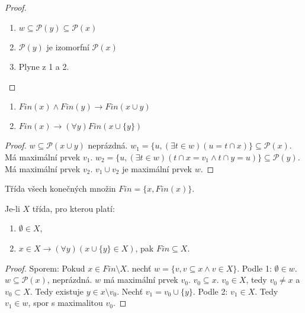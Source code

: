 \begin{proof}
	\begin{enumerate}
		\item $w \subseteq \mathcal{P}(y) \subseteq \mathcal{P}(x)$
		\item $\mathcal{P}(y)$ je izomorfní $\mathcal{P}(x)$
		\item Plyne z 1 a 2.
	\end{enumerate}
\end{proof}

\begin{lemma}
	\begin{enumerate}
		\item $Fin(x) \land Fin(y) \rightarrow Fin(x \cup y)$
		\item $Fin(x) \rightarrow (\forall y) Fin(x \cup \{y\})$
	\end{enumerate}
\end{lemma}

\begin{proof}
	$w \subseteq \mathcal{P}(x \cup y)$ neprázdná. $w_{1} = \{ u, (\exists t \in w)( u = t \cap x)\} \subseteq \mathcal{P}(x)$. Má maximální prvek $v_{1}$. $w_{2} = \{u, (\exists t \in w)( t \cap x = v_{1} \land t \cap y = u)\} \subseteq \mathcal{P}(y)$. Má maximální prvek $v_{2}$. $v_{1} \cup v_{2}$ je maximální prvek $w$.
\end{proof} 

\begin{definice}
	Třída všech konečných množin $Fin = \{x, Fin(x)\}$.
\end{definice}

\begin{thm}
	Je-li $X$ třída, pro kterou platí:
	
	\begin{enumerate}
		\item $\emptyset \in X$,
		\item $x \in X \rightarrow (\forall y)(x \cup \{y\} \in X)$, pak $Fin \subseteq X$.
	\end{enumerate}
\end{thm}

\begin{proof}
	Sporem: Pokud $x \in Fin \setminus X$. nechť $w = \{v, v \subseteq x \land v \in X\}$. Podle 1: $\emptyset \in w$. $w \subseteq \mathcal{P}(x)$, neprázdná. $w$ má maximální prvek $v_{0}$. $v_{0} \subseteq x$. $v_{0} \in X$, tedy $v_{0} \neq x$ a $v_{0} \subset X$. Tedy existuje $y \in x \setminus v_{0}$. Nechť $v_{1} = v_{0} \cup \{y\}$. Podle 2: $v_{1} \in X$. Tedy $v_{1} \in w$, spor s maximalitou $v_{0}$.
\end{proof}

